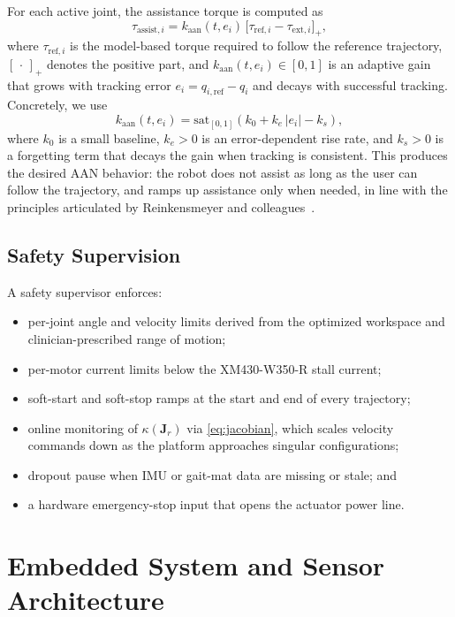 \documentclass[conference]{IEEEtran}
\begin{document}
For each active joint, the assistance torque is computed as
\begin{equation}
\tau_{\mathrm{assist},i}=k_{\mathrm{aan}}(t,e_i)\,\big[\tau_{\mathrm{ref},i}-\tau_{\mathrm{ext},i}\big]_+,
\label{eq:tau_assist}
\end{equation}
where $\tau_{\mathrm{ref},i}$ is the model-based torque required to follow the reference trajectory, $[\,\cdot\,]_+$ denotes the positive part, and $k_{\mathrm{aan}}(t,e_i)\in[0,1]$ is an adaptive gain that grows with tracking error $e_i=q_{i,\mathrm{ref}}-q_i$ and decays with successful tracking. Concretely, we use
\begin{equation}
k_{\mathrm{aan}}(t,e_i)=\mathrm{sat}_{[0,1]}\!\left(k_0+k_e\,|e_i|-k_s\right),
\end{equation}
where $k_0$ is a small baseline, $k_e>0$ is an error-dependent rise rate, and $k_s>0$ is a forgetting term that decays the gain when tracking is consistent. This produces the desired AAN behavior: the robot does not assist as long as the user can follow the trajectory, and ramps up assistance only when needed, in line with the principles articulated by Reinkensmeyer and colleagues~\cite{cai2006implications,marchal2009review}.

\subsection{Safety Supervision}

A safety supervisor enforces:
\begin{itemize}
\item per-joint angle and velocity limits derived from the optimized workspace and clinician-prescribed range of motion;
\item per-motor current limits below the XM430-W350-R stall current;
\item soft-start and soft-stop ramps at the start and end of every trajectory;
\item online monitoring of $\kappa(\mathbf{J}_r)$ via \eqref{eq:jacobian}, which scales velocity commands down as the platform approaches singular configurations;
\item dropout pause when IMU or gait-mat data are missing or stale; and
\item a hardware emergency-stop input that opens the actuator power line.
\end{itemize}

\section{Embedded System and Sensor Architecture}
\label{sec:hardware}
\end{document}
